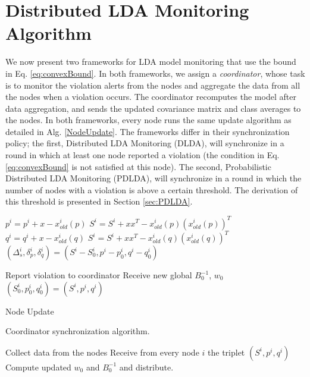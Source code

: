 \section{Distributed LDA Monitoring Algorithm}
We now present two frameworks for LDA model monitoring that use
the bound in Eq. \ref{eq:convexBound}. 
In both frameworks, 
we assign a \textit{coordinator}, whose task is to monitor the violation alerts from the nodes and aggregate the data from all the nodes when a violation occurs. The coordinator recomputes the model after data aggregation, and sends the updated covariance matrix 
and class averages to the nodes.
In both frameworks, every node runs the same
update algorithm as detailed in Alg. \ref{NodeUpdate}.
The frameworks differ in their synchronization policy; 
the first, Distributed LDA Monitoring (DLDA), will synchronize in a round
in which at least one node  reported a violation (the condition in Eq. \ref{eq:convexBound} 
is not satisfied at this node).
The second, Probabilistic Distributed LDA Monitoring (PDLDA), will synchronize in a round in which the number of nodes with a violation is above a certain
threshold.
The derivation of this threshold is presented in Section \ref{sec:PDLDA}.


\begin{algorithm}
\SetAlgoNoLine
{}
{ $p^i = p^i + x - x_{old}^i(p)$ \;
 $S^i = S^i +xx^T - x_{old}^i(p)(x_{old}^i(p))^T$}
\Else
{$q^i = q^i + x -x_{old}^i(q)$ \;
 $S^i = S^i +xx^T - x_{old}^i(q)(x_{old}^i(q))^T$ \;
$(\Delta_s^i,\delta^i_p,\delta_q^i) = (S^i-S^i_0,p^i-p^i_0,q^i-q^i_0)$ }

{Report violation to coordinator \;
Receive new global $B_0^{-1}$, $w_0$ \;
$(S_0^i,p_0^i,q_0^i) = (S^i,p^i,q^i)$ }

\caption{Node Update}

\label{NodeUpdate}
\end{algorithm}


\begin{algorithm}
\SetAlgoNoLine
\caption{Coordinator synchronization algorithm.}\label{DLDA}
{
Collect data from the nodes \;
Receive from every node $i$ the triplet $(S^i,p^i,q^i)$ \;
Compute updated $w_0$ and $B_0^{-1}$ and distribute.}
\end{algorithm}
%
